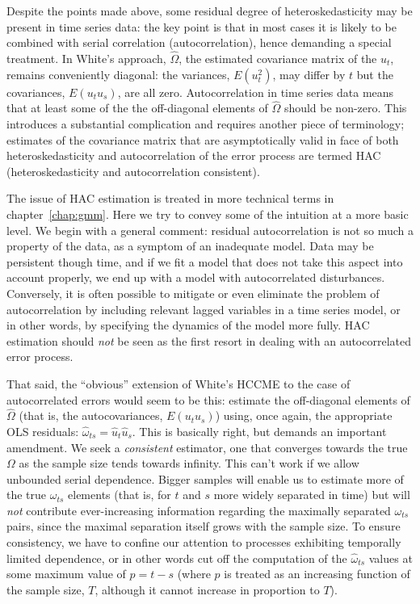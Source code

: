 Despite the points made above, some residual degree of
heteroskedasticity may be present in time series data: the key point
is that in most cases it is likely to be combined with serial
correlation (autocorrelation), hence demanding a special treatment.
In White's approach, $\hat{\Omega}$, the estimated covariance matrix
of the $u_t$, remains conveniently diagonal: the variances,
$E(u^2_t)$, may differ by $t$ but the covariances, $E(u_t u_s)$, are
all zero.  Autocorrelation in time series data means that at least
some of the the off-diagonal elements of $\hat{\Omega}$ should be
non-zero.  This introduces a substantial complication and requires
another piece of terminology; estimates of the covariance matrix that
are asymptotically valid in face of both heteroskedasticity and
autocorrelation of the error process are termed HAC
(heteroskedasticity and autocorrelation consistent).

The issue of HAC estimation is treated in more technical terms in
chapter~\ref{chap:gmm}.  Here we try to convey some of the intuition
at a more basic level.  We begin with a general comment: residual
autocorrelation is not so much a property of the data, as a symptom of
an inadequate model.  Data may be persistent though time, and if we fit
a model that does not take this aspect into account properly, we end
up with a model with autocorrelated disturbances.  Conversely, it is
often possible to mitigate or even eliminate the problem of
autocorrelation by including relevant lagged variables in a time
series model, or in other words, by specifying the dynamics of the
model more fully.  HAC estimation should \textit{not} be seen as the
first resort in dealing with an autocorrelated error process.

That said, the ``obvious'' extension of White's HCCME to the case of
autocorrelated errors would seem to be this: estimate the off-diagonal
elements of $\hat{\Omega}$ (that is, the autocovariances, $E(u_t
u_s)$) using, once again, the appropriate OLS residuals:
$\hat{\omega}_{ts} = \hat{u}_t \hat{u}_s$.  This is basically right,
but demands an important amendment.  We seek a \textit{consistent}
estimator, one that converges towards the true $\Omega$ as the sample
size tends towards infinity.  This can't work if we allow unbounded
serial dependence.  Bigger samples will enable us to estimate more of
the true $\omega_{ts}$ elements (that is, for $t$ and $s$ more widely
separated in time) but will \textit{not} contribute ever-increasing
information regarding the maximally separated $\omega_{ts}$ pairs,
since the maximal separation itself grows with the sample size.  To
ensure consistency, we have to confine our attention to processes
exhibiting temporally limited dependence, or in other words cut off
the computation of the $\hat{\omega}_{ts}$ values at some maximum
value of $p = t-s$ (where $p$ is treated as an increasing function of
the sample size, $T$, although it cannot increase in proportion to
$T$).

